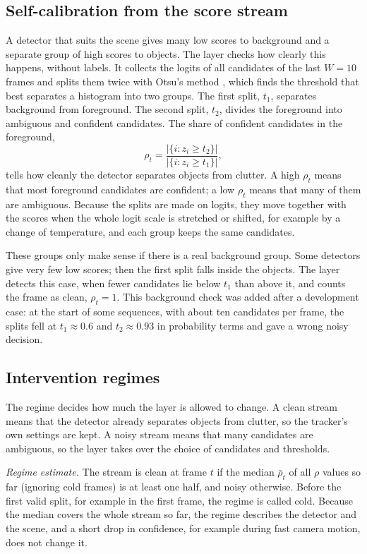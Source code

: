 \subsection{Self-calibration from the score stream}\label{sec:calib}
A detector that suits the scene gives many low scores to background and a
separate group of high scores to objects. The layer checks how clearly this
happens, without labels. It collects the logits of all candidates of the
last $W=10$ frames and splits them twice with Otsu's method \cite{otsu1979},
which finds the threshold that best separates a histogram into two groups.
The first split, $t_1$, separates background from foreground. The second
split, $t_2$, divides the foreground into ambiguous and confident
candidates. The share of confident candidates in the foreground,
\begin{equation}
\rho_t=\frac{\left|\{i: z_i\ge t_2\}\right|}{\left|\{i: z_i\ge t_1\}\right|},
\label{eq:rho}
\end{equation}
tells how cleanly the detector separates objects from clutter. A high
$\rho_t$ means that most foreground candidates are confident; a low
$\rho_t$ means that many of them are ambiguous. Because the splits are
made on logits, they move together with the scores when the whole logit
scale is stretched or shifted, for example by a change of temperature, and
each group keeps the same candidates.

These groups only make sense if there is a real background group. Some
detectors give very few low scores; then the first split falls inside the
objects. The layer detects this case, when fewer candidates lie below $t_1$
than above it, and counts the frame as clean, $\rho_t=1$. This background
check was added after a development case: at the start of some sequences,
with about ten candidates per frame, the splits fell at $t_1\approx0.6$ and
$t_2\approx0.93$ in probability terms and gave a wrong noisy decision.

\subsection{Intervention regimes}\label{sec:regimes}
The regime decides how much the layer is allowed to change. A clean stream
means that the detector already separates objects from clutter, so the
tracker's own settings are kept. A noisy stream means that many candidates
are ambiguous, so the layer takes over the choice of candidates and
thresholds.

\emph{Regime estimate.} The stream is clean at frame $t$ if the median
$\bar\rho_t$ of all $\rho$ values so far (ignoring cold frames) is at
least one half, and noisy otherwise. Before the first valid split, for
example in the first frame, the regime is called cold. Because the median
covers the whole stream so far, the regime describes the detector and the
scene, and a short drop in confidence, for example during fast camera
motion, does not change it.

